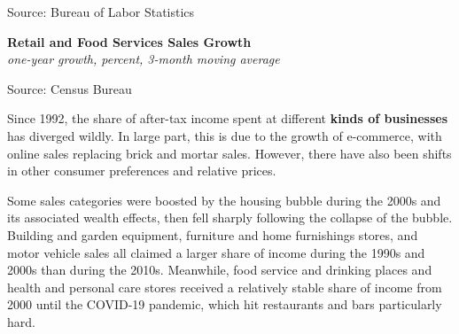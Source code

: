\documentclass{report}
\makeatletter
\newcommand{\tbllink}[1]{\href{https://raw.githubusercontent.com/bdecon/US-chartbook/master/chartbook/data/#1}{\faTable}}
\newcommand*\short[1]{\expandafter\@gobbletwo\number\numexpr#1\relax}
\newcommand{\absnode}[3]{\node[below right, align=left] at (axis cs: #1,#2) {#3};}
\newcommand{\dateaxisticks}{
		date coordinates in=x, axis line style={draw=none},
		xmax={2023-10-01},
		max space between ticks=40,	    
		xtick={{1990-01-01}, {1992-01-01}, {1994-01-01}, 
			{1996-01-01}, {1998-01-01}, {2000-01-01}, 
			{2002-01-01}, {2004-01-01}, {2006-01-01},
			{2008-01-01}, {2010-01-01}, {2012-01-01}, {2014-01-01},
		    {2016-01-01}, {2018-01-01}, {2020-01-01}, {2022-01-01}, 
		    {2024-01-01}, {2026-01-01}},
		minor xtick={{1989-01-01}, {1991-01-01}, {1993-01-01},
			{1995-01-01}, {1997-01-01}, {1999-01-01}, 
			{2001-01-01}, {2003-01-01}, {2005-01-01}, {2007-01-01},
		    {2009-01-01}, {2011-01-01}, {2013-01-01}, {2015-01-01},
		    {2017-01-01}, {2019-01-01}, {2021-01-01}, {2023-01-01}, 
		    {2025-01-01}, {2027-01-01}},
		enlarge y limits={0.06}, enlarge x limits={0.01},
		}
\newcommand{\bbar}[2]{extra #1 ticks = {{#2}}, extra #1 tick labels = ,
		extra #1 tick style = {grid=major, grid style={thick, black!25}},}
\newcommand{\stdline}[4]{\addplot[very thick, no markers, color=#1] 
		table [x=#2, y=#3, col sep=comma] {#4};	}
\newcommand{\thickline}[4]{\addplot[ultra thick, no markers, color=#1] 
		table [x=#2, y=#3, col sep=comma] {#4};	}
\newcommand{\rebars}{
		\fill[color=black!10] (axis cs:{2007-12-01},\pgfkeysvalueof{/pgfplots/ymin}) rectangle 
			(axis cs:{2009-07-01}, \pgfkeysvalueof{/pgfplots/ymax});
		\fill[color=black!10] (axis cs:{2001-03-01},\pgfkeysvalueof{/pgfplots/ymin}) rectangle 
			(axis cs:{2001-11-01}, \pgfkeysvalueof{/pgfplots/ymax});
		\fill[color=black!10] (axis cs:{2020-02-01},\pgfkeysvalueof{/pgfplots/ymin}) rectangle 
			(axis cs:{2020-05-01}, \pgfkeysvalueof{/pgfplots/ymax});}
\makeatother
\begin{document}
{\begin{minipage}{0.76\textwidth}
\footnotesize{Source: Bureau of Labor Statistics} \hfill \tbllink{rs_sh.csv}
\vspace{3mm}

\small 
\vspace{0.5mm}

\normalsize \textbf{Retail and Food Services Sales Growth}\\
\footnotesize{\textit{one-year growth, percent, 3-month moving average}}
\vspace{32mm}

\hspace{3mm} 

\footnotesize{Source: Census Bureau} \hfill \tbllink{marts.csv}
\end{minipage}
\newpage
\begin{minipage}{0.76\textwidth}  
\small Since 1992, the share of after-tax income spent at different \textbf{kinds of businesses} has diverged wildly. In large part, this is due to the growth of e-commerce, with online sales replacing brick and mortar sales. However, there have also been shifts in other consumer preferences and relative prices. 

 

Some sales categories were boosted by the housing bubble during the 2000s and its associated wealth effects, then fell sharply following the collapse of the bubble. Building and garden equipment, furniture and home furnishings stores, and motor vehicle sales all claimed a larger share of income during the 1990s and 2000s than during the 2010s. Meanwhile, food service and drinking places and health and personal care stores received a relatively stable share of income from 2000 until the COVID-19 pandemic, which hit restaurants and bars particularly hard. 


\end{minipage}}
\end{document}
